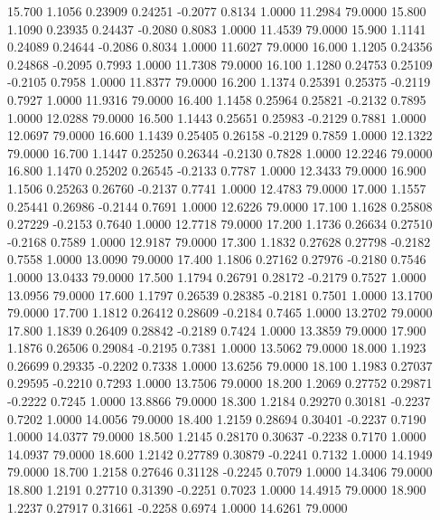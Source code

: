   15.700   1.1056   0.23909   0.24251  -0.2077   0.8134   1.0000  11.2984  79.0000
  15.800   1.1090   0.23935   0.24437  -0.2080   0.8083   1.0000  11.4539  79.0000
  15.900   1.1141   0.24089   0.24644  -0.2086   0.8034   1.0000  11.6027  79.0000
  16.000   1.1205   0.24356   0.24868  -0.2095   0.7993   1.0000  11.7308  79.0000
  16.100   1.1280   0.24753   0.25109  -0.2105   0.7958   1.0000  11.8377  79.0000
  16.200   1.1374   0.25391   0.25375  -0.2119   0.7927   1.0000  11.9316  79.0000
  16.400   1.1458   0.25964   0.25821  -0.2132   0.7895   1.0000  12.0288  79.0000
  16.500   1.1443   0.25651   0.25983  -0.2129   0.7881   1.0000  12.0697  79.0000
  16.600   1.1439   0.25405   0.26158  -0.2129   0.7859   1.0000  12.1322  79.0000
  16.700   1.1447   0.25250   0.26344  -0.2130   0.7828   1.0000  12.2246  79.0000
  16.800   1.1470   0.25202   0.26545  -0.2133   0.7787   1.0000  12.3433  79.0000
  16.900   1.1506   0.25263   0.26760  -0.2137   0.7741   1.0000  12.4783  79.0000
  17.000   1.1557   0.25441   0.26986  -0.2144   0.7691   1.0000  12.6226  79.0000
  17.100   1.1628   0.25808   0.27229  -0.2153   0.7640   1.0000  12.7718  79.0000
  17.200   1.1736   0.26634   0.27510  -0.2168   0.7589   1.0000  12.9187  79.0000
  17.300   1.1832   0.27628   0.27798  -0.2182   0.7558   1.0000  13.0090  79.0000
  17.400   1.1806   0.27162   0.27976  -0.2180   0.7546   1.0000  13.0433  79.0000
  17.500   1.1794   0.26791   0.28172  -0.2179   0.7527   1.0000  13.0956  79.0000
  17.600   1.1797   0.26539   0.28385  -0.2181   0.7501   1.0000  13.1700  79.0000
  17.700   1.1812   0.26412   0.28609  -0.2184   0.7465   1.0000  13.2702  79.0000
  17.800   1.1839   0.26409   0.28842  -0.2189   0.7424   1.0000  13.3859  79.0000
  17.900   1.1876   0.26506   0.29084  -0.2195   0.7381   1.0000  13.5062  79.0000
  18.000   1.1923   0.26699   0.29335  -0.2202   0.7338   1.0000  13.6256  79.0000
  18.100   1.1983   0.27037   0.29595  -0.2210   0.7293   1.0000  13.7506  79.0000
  18.200   1.2069   0.27752   0.29871  -0.2222   0.7245   1.0000  13.8866  79.0000
  18.300   1.2184   0.29270   0.30181  -0.2237   0.7202   1.0000  14.0056  79.0000
  18.400   1.2159   0.28694   0.30401  -0.2237   0.7190   1.0000  14.0377  79.0000
  18.500   1.2145   0.28170   0.30637  -0.2238   0.7170   1.0000  14.0937  79.0000
  18.600   1.2142   0.27789   0.30879  -0.2241   0.7132   1.0000  14.1949  79.0000
  18.700   1.2158   0.27646   0.31128  -0.2245   0.7079   1.0000  14.3406  79.0000
  18.800   1.2191   0.27710   0.31390  -0.2251   0.7023   1.0000  14.4915  79.0000
  18.900   1.2237   0.27917   0.31661  -0.2258   0.6974   1.0000  14.6261  79.0000
